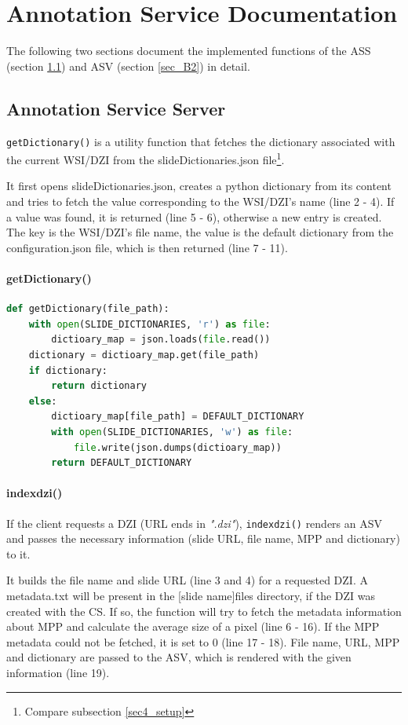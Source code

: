 \chapter{Annotation Service Documentation}

The following two sections document the implemented functions of the ASS (section \ref{sec_B1}) and ASV (section \ref{sec_B2}) in detail. 

\section{Annotation Service Server}
\label{sec_B1}

\texttt{getDictionary()} is a utility function that fetches the dictionary associated with the current WSI/DZI from the slideDictionaries.json file\footnote{
	Compare subsection \ref{sec4_setup}
}.

It first opens slideDictionaries.json, creates a python dictionary from its content and tries to fetch the value corresponding to the WSI/DZI's name (line 2 - 4). If a value was found, it is returned (line 5 - 6), otherwise a new entry is created. The key is the WSI/DZI's file name, the value is the default dictionary from the configuration.json file, which is then returned (line 7 - 11).

\subsubsection{getDictionary()}
\begin{lstlisting}[language=Python, frame=single]
def getDictionary(file_path):
	with open(SLIDE_DICTIONARIES, 'r') as file:
		dictioary_map = json.loads(file.read())
	dictionary = dictioary_map.get(file_path)
	if dictionary:
		return dictionary
	else:
		dictioary_map[file_path] = DEFAULT_DICTIONARY
		with open(SLIDE_DICTIONARIES, 'w') as file:
			file.write(json.dumps(dictioary_map))
		return DEFAULT_DICTIONARY
\end{lstlisting}

\subsubsection{index{\textunderscore}dzi()}
If the client requests a DZI (URL ends in \emph{".dzi"}), \texttt{index{\textunderscore}dzi()} renders an ASV and passes the necessary information (slide URL, file name, MPP and dictionary) to it.

It builds the file name and slide URL (line 3 and 4) for a requested DZI. A metadata.txt will be present in the [slide name]{\textunderscore}files directory, if the DZI was created with the CS. If so, the function will try to fetch the metadata information about MPP and calculate the average size of a pixel (line 6 - 16). If the MPP metadata could not be fetched, it is set to 0 (line 17 - 18). File name, URL, MPP and dictionary are passed to the ASV, which is rendered with the given information (line 19).

